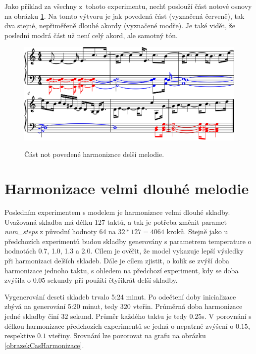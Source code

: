 Jako příklad za všechny z~tohoto experimentu,
nechť poslouží část notové osnovy na obrázku \ref{obrazekMyHarmonyLongPovedenaNoty}.
Na tomto výtvoru je jak povedená část (vyznačená červeně),
tak dva stejné, nepřiměřeně dlouhé akordy (vyznačené modře).
Je také vidět, že poslední modrá část už není celý akord, ale samotný tón.

\begin{figure}[h]\centering
    \centering
    \includegraphics[width=0.8\linewidth]{obrazky/MyMelodyLongPovedenaHarmonizaceCastNot-1.png}\\[1pt]  
    \caption{Část not povedené harmonizace delší melodie.}    
    \label{obrazekMyHarmonyLongPovedenaNoty}
\end{figure}

\section{Harmonizace velmi dlouhé melodie}
Posledním experimentem s modelem je harmonizace velmi dlouhé skladby.
Uvažovaná skladba má délku 127 taktů, 
a tak je potřeba změnit paramet \emph{num\_steps} 
z původní hodnoty 64 na $ 32 * 127 = 4064$ kroků.
Stejně jako u předchozích experimentů budou skladby generovány
s parametrem temperature o hodnotách 0.7, 1.0, 1.3 a 2.0.
Cílem je ověřit, že model vykazuje lepší výsledky 
při harmonizaci delších skladeb.
Dále je cílem zjistit, o kolik se zvýší doba harmonizace jednoho taktu,
s ohledem na předchozí experiment,
kdy se doba zvýšila o $0.05$ sekundy při použití čtyřikrát delší skladby.
\par
Vygenerování deseti skladeb trvalo 5:24 minut.
Po odečtení doby inicializace zbývá na generování 5:20 minut,
tedy $320$ vteřin.
Průměrná doba harmonizace jedné skladby činí $32$ sekund.
Průměr každého taktu je tedy $0.25$s.
V porovnání s délkou harmonizace předchozích experimentů
se jedná o nepatrné zvýšení o $0.15$, respektive $0.1$ vteřiny.
Srovnání lze pozorovat na grafu na obrázku \ref{obrazekCasHarmonizace}.

